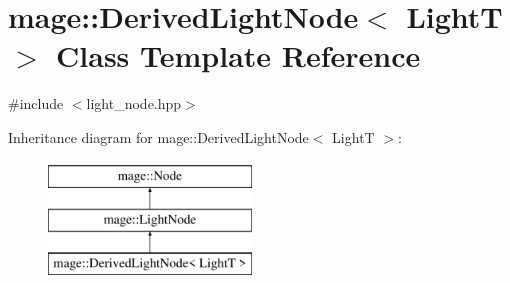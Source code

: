 \hypertarget{classmage_1_1_derived_light_node}{}\section{mage\+:\+:Derived\+Light\+Node$<$ LightT $>$ Class Template Reference}
\label{classmage_1_1_derived_light_node}


{\ttfamily \#include $<$light\+\_\+node.\+hpp$>$}

Inheritance diagram for mage\+:\+:Derived\+Light\+Node$<$ LightT $>$\+:\begin{figure}[H]
\begin{center}
\leavevmode
\includegraphics[height=3.000000cm]{classmage_1_1_derived_light_node}
\end{center}
\end{figure}
